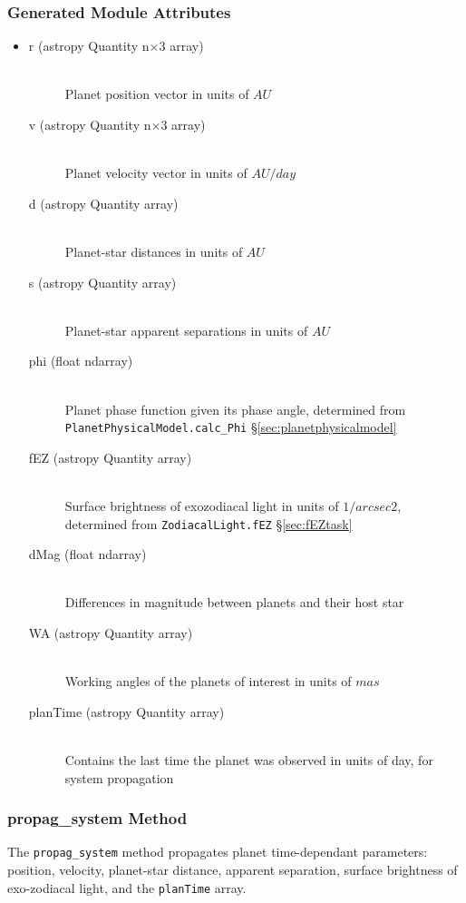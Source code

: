 \documentclass[cleanfoot]{asme2ej}
\begin{document}
\subsubsection*{Generated Module Attributes}
\begin{itemize}
\item 
\begin{description}
    \item[r (astropy Quantity n$\times$3 array)] \hfill \\ Planet position vector in units of $ AU $
    \item[v (astropy Quantity n$\times$3 array)] \hfill \\ Planet velocity vector in units of $ AU/day $
    \item[d (astropy Quantity array)] \hfill \\ Planet-star distances in units of $ AU $
    \item[s (astropy Quantity array)] \hfill \\ Planet-star apparent separations in units of $ AU $
    \item[phi (float ndarray)] \hfill \\ Planet phase function given its phase angle, determined from \verb+PlanetPhysicalModel.calc_Phi+ \S\ref{sec:planetphysicalmodel}
    \item[fEZ (astropy Quantity array)] \hfill \\ Surface brightness of exozodiacal light in units of $ 1/arcsec2 $, determined from \verb+ZodiacalLight.fEZ+ \S\ref{sec:fEZtask}
    \item[dMag (float ndarray)] \hfill \\ Differences in magnitude between planets and their host star
    \item[WA (astropy Quantity array)] \hfill \\ Working angles of the planets of interest in units of $ mas $ 
    \item[planTime (astropy Quantity array)] \hfill \\ Contains the last time the planet was observed in units of day, for system propagation
\end{description}
\end{itemize}

\subsubsection{propag\_system Method} \label{sec:propagsystemtask}
The \verb+propag_system+ method propagates planet time-dependant parameters: position, velocity, planet-star distance, apparent separation, surface brightness of exo-zodiacal light, and the \verb+planTime+ array. 
\end{document}
